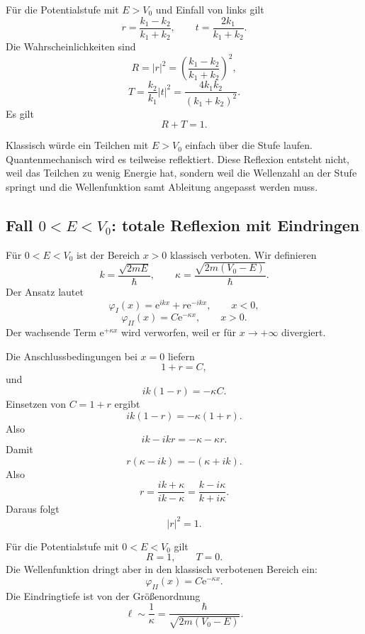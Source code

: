 \begin{formulabox}
Für die Potentialstufe mit $E>V_0$ und Einfall von links gilt
\[
    r=\frac{k_1-k_2}{k_1+k_2},
    \qquad
    t=\frac{2k_1}{k_1+k_2}.
\]
Die Wahrscheinlichkeiten sind
\[
    R=|r|^2=\left(\frac{k_1-k_2}{k_1+k_2}\right)^2,
\]
\[
    T=\frac{k_2}{k_1}|t|^2
    =\frac{4k_1k_2}{(k_1+k_2)^2}.
\]
Es gilt
\[
    R+T=1.
\]
\end{formulabox}

\begin{conceptbox}
Klassisch würde ein Teilchen mit $E>V_0$ einfach über die Stufe laufen. Quantenmechanisch wird es teilweise reflektiert. Diese Reflexion entsteht nicht, weil das Teilchen zu wenig Energie hat, sondern weil die Wellenzahl an der Stufe springt und die Wellenfunktion samt Ableitung angepasst werden muss.
\end{conceptbox}

\subsection{Fall $0<E<V_0$: totale Reflexion mit Eindringen}

Für $0<E<V_0$ ist der Bereich $x>0$ klassisch verboten. Wir definieren
\[
    k=\frac{\sqrt{2mE}}{\hbar},
    \qquad
    \kappa=\frac{\sqrt{2m(V_0-E)}}{\hbar}.
\]
Der Ansatz lautet
\[
    \varphi_I(x)=\mathrm{e}^{ikx}+r\mathrm{e}^{-ikx},
    \qquad x<0,
\]
\[
    \varphi_{II}(x)=C\mathrm{e}^{-\kappa x},
    \qquad x>0.
\]
Der wachsende Term $\mathrm{e}^{+\kappa x}$ wird verworfen, weil er für $x\to+\infty$ divergiert.

\begin{derivationbox}
Die Anschlussbedingungen bei $x=0$ liefern
\[
    1+r=C,
\]
und
\[
    ik(1-r)=-\kappa C.
\]
Einsetzen von $C=1+r$ ergibt
\[
    ik(1-r)=-\kappa(1+r).
\]
Also
\[
    ik-ikr=-\kappa-\kappa r.
\]
Damit
\[
    r(\kappa-ik)=-(\kappa+ik).
\]
Also
\[
    r=\frac{ik+\kappa}{ik-\kappa}
    =\frac{k-i\kappa}{k+i\kappa}.
\]
Daraus folgt
\[
    |r|^2=1.
\]
\end{derivationbox}

\begin{formulabox}
Für die Potentialstufe mit $0<E<V_0$ gilt
\[
    R=1,
    \qquad
    T=0.
\]
Die Wellenfunktion dringt aber in den klassisch verbotenen Bereich ein:
\[
    \varphi_{II}(x)=C\mathrm{e}^{-\kappa x}.
\]
Die Eindringtiefe ist von der Größenordnung
\[
    \ell\sim\frac{1}{\kappa}
    =\frac{\hbar}{\sqrt{2m(V_0-E)}}.
\]
\end{formulabox}

